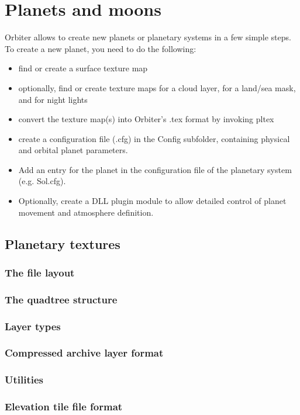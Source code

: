 \documentclass[Orbiter Developer Manual.tex]{subfiles}
\begin{document}
\section{Planets and moons}
Orbiter allows to create new planets or planetary systems in a few simple steps. To create a new planet, you need to do the following:

\begin{itemize}
\item find or create a surface texture map
\item optionally, find or create texture maps for a cloud layer, for a land/sea mask, and for night lights
\item convert the texture map(s) into Orbiter’s .tex format by invoking pltex
\item create a configuration file (.cfg) in the Config subfolder, containing physical and orbital planet parameters.
\item Add an entry for the planet in the configuration file of the planetary system (e.g. Sol.cfg).
\item Optionally, create a DLL plugin module to allow detailed control of planet movement and atmosphere definition.
\end{itemize}


\subsection{Planetary textures}

\subsubsection{The file layout}
\subsubsection{The quadtree structure}
\subsubsection{Layer types}
\subsubsection{Compressed archive layer format}
\subsubsection{Utilities}
\subsubsection{Elevation tile file format}
\end{document}
